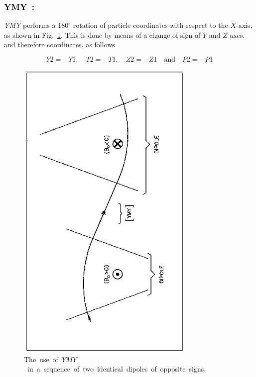 \newpage

\subsubsection*{YMY~: \YMYTitl} \label{YMY} 
\medskip 

\textsl{YMY}  performs a 180$^\circ$ rotation of particle coordinates with respect to the 
$ X $-axis, as shown  in Fig.~\ref{fig33}. 
This is done by means of a change of sign of $ Y $ and $ Z $ axes,  
and therefore coordinates, as follows 

$$ Y2=-Y1,\quad T2=-T1,\quad Z2=-Z1 \quad \text{and} \quad P2=-P1 $$

\vfill
\begin{figure}[H]
\centerline{\includegraphics[height=15cm,angle=-90]{Fig33.ps}}
\caption{\label{fig33}\mbox{The use of $ YMY $ in a sequence of two identical
dipoles of opposite signs.}}
\end{figure}
\vfill






